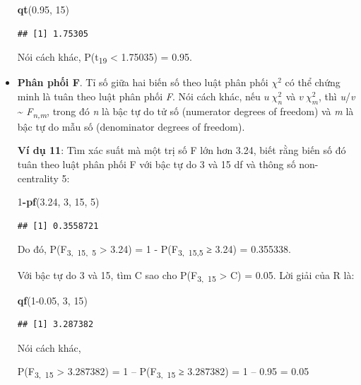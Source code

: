\documentclass[
]{book}
\newenvironment{Shaded}{\begin{snugshade}}{\end{snugshade}}
\newcommand{\DecValTok}[1]{\textcolor[rgb]{0.00,0.00,0.81}{#1}}
\newcommand{\FloatTok}[1]{\textcolor[rgb]{0.00,0.00,0.81}{#1}}
\newcommand{\KeywordTok}[1]{\textcolor[rgb]{0.13,0.29,0.53}{\textbf{#1}}}
\newcommand{\NormalTok}[1]{#1}
\newcommand{\OperatorTok}[1]{\textcolor[rgb]{0.81,0.36,0.00}{\textbf{#1}}}
\begin{document}
\begin{itemize}
\begin{Shaded}
\begin{Highlighting}[]
\KeywordTok{qt}\NormalTok{(}\FloatTok{0.95}\NormalTok{, }\DecValTok{15}\NormalTok{)}
\end{Highlighting}
\end{Shaded}

\begin{verbatim}
## [1] 1.75305
\end{verbatim}

  Nói cách khác, P(t\textsubscript{19} \textless{} 1.75035) = 0.95.
\item
  \textbf{Phân phối F}. Tỉ số giữa hai biến số theo luật phân phối \(\chi^{2}\) có thể chứng minh là tuân theo luật phân phối \emph{F}. Nói cách khác, nếu \(u ~ \chi_{n}^{2}\) và \(v ~ \chi_{m}^{2}\), thì \emph{u}/\emph{v} \textasciitilde{} \emph{F\textsubscript{n,m}}, trong đó \emph{n} là bậc tự do tử số (numerator degrees of freedom) và \emph{m} là bậc tự do mẫu số (denominator degrees of freedom).

  \textbf{Ví dụ 11}: Tìm xác suất mà một trị số F lớn hơn 3.24, biết rằng biến số đó tuân theo luật phân phối F với bậc tự do 3 và 15 df và thông số non-centrality 5:

\begin{Shaded}
\begin{Highlighting}[]
\DecValTok{1}\OperatorTok{{-}}\KeywordTok{pf}\NormalTok{(}\FloatTok{3.24}\NormalTok{, }\DecValTok{3}\NormalTok{, }\DecValTok{15}\NormalTok{, }\DecValTok{5}\NormalTok{)}
\end{Highlighting}
\end{Shaded}

\begin{verbatim}
## [1] 0.3558721
\end{verbatim}

  Do đó, P(F\textsubscript{3,~15,~5} \textgreater{} 3.24) = 1 - P(F\textsubscript{3,~15,5} ≥ 3.24) = 0.355338.

  Với bậc tự do 3 và 15, tìm C sao cho P(F\textsubscript{3,~15} \textgreater{} C) = 0.05. Lời giải của R là:

\begin{Shaded}
\begin{Highlighting}[]
\KeywordTok{qf}\NormalTok{(}\DecValTok{1}\FloatTok{{-}0.05}\NormalTok{, }\DecValTok{3}\NormalTok{, }\DecValTok{15}\NormalTok{)}
\end{Highlighting}
\end{Shaded}

\begin{verbatim}
## [1] 3.287382
\end{verbatim}

  Nói cách khác,

  P(F\textsubscript{3,~15} \textgreater{} 3.287382) = 1 -- P(F\textsubscript{3,~15} ≥ 3.287382) = 1 -- 0.95 = 0.05
\end{itemize}
\end{document}
